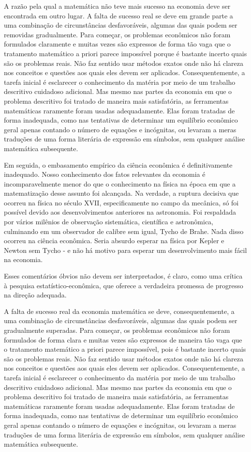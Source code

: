 \documentclass[12pt]{article}
\begin{document}
A razão pela qual a matemática não teve mais sucesso na economia deve ser encontrada em outro lugar. A falta de sucesso real se deve em grande parte a uma combinação de circunstâncias desfavoráveis, algumas das quais podem ser removidas gradualmente. Para começar, os problemas econômicos não foram formulados claramente e muitas vezes são expressos de forma tão vaga que o tratamento matemático a priori parece impossível porque é bastante incerto quais são os problemas reais. Não faz sentido usar métodos exatos onde não há clareza nos conceitos e questões aos quais eles devem ser aplicados. Consequentemente, a tarefa inicial é esclarecer o conhecimento da matéria por meio de um trabalho descritivo cuidadoso adicional. Mas mesmo nas partes da economia em que o problema descritivo foi tratado de maneira mais satisfatória, as ferramentas matemáticas raramente foram usadas adequadamente. Elas foram tratadas de forma inadequada, como nas tentativas de determinar um equilíbrio econômico geral apenas contando o número de equações e incógnitas, ou levaram a meras traduções de uma forma literária de expressão em símbolos, sem qualquer análise matemática subsequente.

Em seguida, o embasamento empírico da ciência econômica é definitivamente inadequado. Nosso conhecimento dos fatos relevantes da economia é incomparavelmente menor do que o conhecimento na física na época em que a matematização desse assunto foi alcançada. Na verdade, a ruptura decisiva que ocorreu na física no século XVII, especificamente no campo da mecânica, só foi possível devido aos desenvolvimentos anteriores na astronomia. Foi respaldada por vários milênios de observação sistemática, científica e astronômica, culminando em um observador de calibre sem igual, Tycho de Brahe. Nada disso ocorreu na ciência econômica. Seria absurdo esperar na física por Kepler e Newton sem Tycho - e não há motivo para esperar um desenvolvimento mais fácil na economia.

Esses comentários óbvios não devem ser interpretados, é claro, como uma crítica à pesquisa estatístico-econômica, que oferece a verdadeira promessa de progresso na direção adequada.

A falta de sucesso real da economia matemática se deve, consequentemente, a uma combinação de circunstâncias desfavoráveis, algumas das quais podem ser gradualmente superadas. Para começar, os problemas econômicos não foram formulados de forma clara e muitas vezes são expressos de maneira tão vaga que o tratamento matemático a priori parece impossível, pois é bastante incerto quais são os problemas reais. Não faz sentido usar métodos exatos onde não há clareza nos conceitos e questões aos quais eles devem ser aplicados. Consequentemente, a tarefa inicial é esclarecer o conhecimento da matéria por meio de um trabalho descritivo cuidadoso adicional. Mas mesmo nas partes da economia em que o problema descritivo foi tratado de maneira mais satisfatória, as ferramentas matemáticas raramente foram usadas adequadamente. Elas foram tratadas de forma inadequada, como nas tentativas de determinar um equilíbrio econômico geral apenas contando o número de equações e incógnitas, ou levaram a meras traduções de uma forma literária de expressão em símbolos, sem qualquer análise matemática subsequente.
\end{document}
